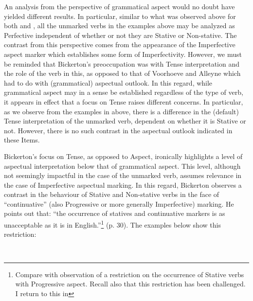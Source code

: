 An analysis from the perspective of grammatical aspect would no doubt
have yielded different results.  In particular, similar to what was
observed above for both \citet{Voorhoeve1957} and \citet{Alleyne1980},
all the unmarked verbs in the examples above  may be analyzed as
Perfective independent of whether or not they are Stative or
Non-stative.  The contrast from this perspective comes from the
appearance of the Imperfective aspect marker which establishes some
form of Imperfectivity.  However, we must be reminded that Bickerton’s
preoccupation was with Tense interpretation and the role of the verb
in this, as opposed to that of Voorhoeve and Alleyne which had to do
with (grammatical) aspectual outlook.  In this regard, while
grammatical aspect may in a sense be established regardless of the
type of verb, it appears in effect that a focus on Tense raises
different concerns.  In particular, as we observe from the examples in
 above, there is a difference in the (default) Tense
interpretation of the unmarked verb, dependent on whether it is
Stative or not.  However, there is no such contrast in the aspectual
outlook indicated in these Items.

Bickerton’s focus on Tense, as opposed to Aspect, ironically
highlights a level of aspectual interpretation below that of
grammatical aspect.  This level, although not seemingly impactful in
the case of the unmarked verb, assumes relevance in the case of
Imperfective aspectual marking.  In this regard, Bickerton observes a
contrast in the behaviour of Stative and Non-stative verbs in the face
of “continuative” (also Progressive or more generally Imperfective)
marking.  He points out that: “the occurrence of statives and
continuative markers is as unacceptable as it is in
English.”\footnote{Compare with  observation of
  a restriction on the occurrence of Stative verbs with Progressive
  aspect. Recall also that this restriction has been challenged. I
  return to this in } (p. 30).  The examples below show
this restriction:

\ea%
\label{ex:2:7}
\citet[30]{Bickerton1975} \\

\z 
\z

